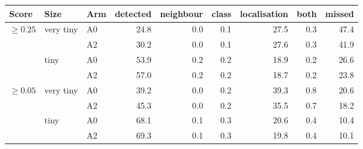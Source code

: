 \begin{tabular}{lllrrrrrr}
\toprule
Score & Size & Arm & detected & neighbour & class & localisation & both & missed \\
\midrule
$\geq 0.25$ & very tiny & A0 & 24.8 & 0.0 & 0.1 & 27.5 & 0.3 & 47.4 \\
 &  & A2 & 30.2 & 0.0 & 0.1 & 27.6 & 0.3 & 41.9 \\
 & tiny & A0 & 53.9 & 0.2 & 0.2 & 18.9 & 0.2 & 26.6 \\
 &  & A2 & 57.0 & 0.2 & 0.2 & 18.7 & 0.2 & 23.8 \\
\midrule
$\geq 0.05$ & very tiny & A0 & 39.2 & 0.0 & 0.2 & 39.3 & 0.8 & 20.6 \\
 &  & A2 & 45.3 & 0.0 & 0.2 & 35.5 & 0.7 & 18.2 \\
 & tiny & A0 & 68.1 & 0.1 & 0.3 & 20.6 & 0.4 & 10.4 \\
 &  & A2 & 69.3 & 0.1 & 0.3 & 19.8 & 0.4 & 10.1 \\
\bottomrule
\end{tabular}
